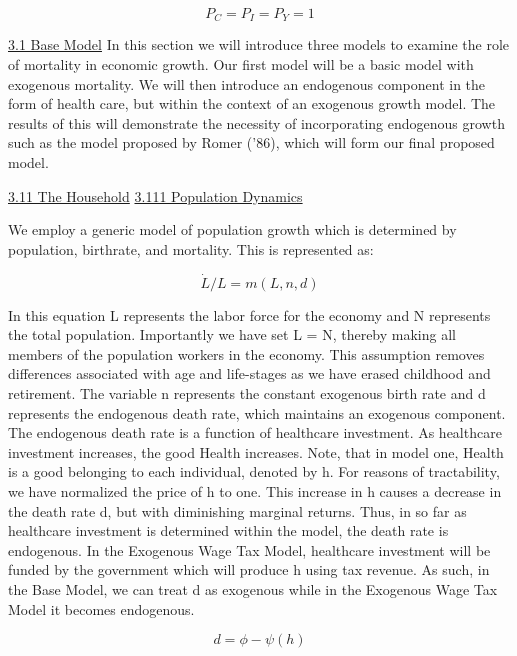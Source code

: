 \documentclass[12pt]{article}%
\begin{document}
\begin{equation}
P_{C} = P_{I} = P_{Y} = 1
\end{equation}

\underline{3.1 Base Model}
	In this section we will introduce three models to examine the role of mortality in economic growth. Our first model will be a basic model with exogenous mortality. We will then introduce an endogenous component in the form of health care, but within the context of an exogenous growth model. The results of this will demonstrate the necessity of incorporating endogenous growth such as the model proposed by Romer (’86), which will form our final proposed model. 

\underline{3.11 The Household}
\underline{3.111 Population Dynamics}

We employ a generic model of population growth which is determined by population, birthrate, and mortality. This is represented as:

\begin{equation}
\dot{L} / L = m(L,n,d)
\end{equation}

In this equation L represents the labor force for the economy and N represents the total population. Importantly we have set L = N, thereby making all members of the population workers in the economy. This assumption removes differences associated with age and life-stages as we have erased childhood and retirement. The variable n represents the constant exogenous birth rate and d represents the endogenous death rate, which maintains an exogenous component. 
	The endogenous death rate is a function of healthcare investment. As healthcare investment increases, the good Health increases. Note, that in model one, Health is a good belonging to each individual, denoted by h. For reasons of tractability, we have normalized the price of h to one. This increase in h causes a decrease in the death rate d, but with diminishing marginal returns. Thus, in so far as healthcare investment is determined within the model, the death rate is endogenous. In the Exogenous Wage Tax Model, healthcare investment will be funded by the government which will produce h using tax revenue. As such, in the Base Model, we can treat d as exogenous while in the Exogenous Wage Tax Model it becomes endogenous.

\begin{equation}
d = \phi - \psi(h)
\end{equation}
\end{document}
